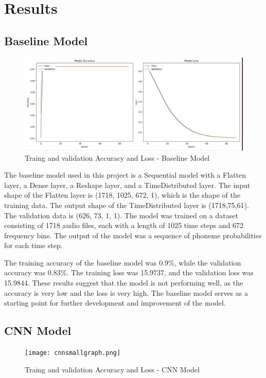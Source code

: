 \documentclass[12pt]{article}
\begin{document}
\section{Results}
\subsection{Baseline Model}

\begin{figure}[ht]
  \centering
  \includegraphics[width=.97\textwidth]{figures/CNNgraph.png}
  \caption{Traing and validation Accuracy and Loss - Baseline Model}
  \label{fig:overview_architecture}
\end{figure}

The baseline model used in this project is a Sequential model with a Flatten layer, a Dense layer, a Reshape layer, and a TimeDistributed layer. The input shape of the Flatten layer is (1718, 1025, 672, 1), which is the shape of the training data. The output shape of the TimeDistributed layer is (1718,75,61). The validation data is (626, 73, 1, 1). The model was trained on a dataset consisting of 1718 audio files, each with a length of 1025 time steps and 672 frequency bins. The output of the model was a sequence of phoneme probabilities for each time step.

The training accuracy of the baseline model was 0.9\%, while the validation accuracy was 0.83\%. The training loss was 15.9737, and the validation loss was 15.9844. These results suggest that the model is not performing well, as the accuracy is very low and the loss is very high. The baseline model serves as a starting point for further development and improvement of the model.


\subsection{CNN Model}

\begin{figure}[ht]
  \centering
  \texttt{[image: cnnsmallgraph.png]}
  \caption{Traing and validation Accuracy and Loss - CNN Model}
  \label{fig:overview_architecture}
\end{figure}
\end{document}
